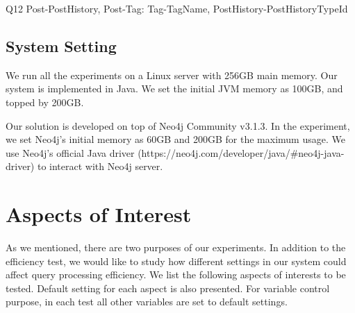 Q12 \hspace{1.3mm} Post-PostHistory, Post-Tag: Tag-TagName, PostHistory-PostHistoryTypeId





\subsection{System Setting}

We run all the experiments on a Linux server with 256GB main memory. Our system is implemented in Java. We set the initial JVM memory as 100GB, and topped by 200GB. 

Our solution is developed on top of Neo4j Community v3.1.3. In the experiment, we set Neo4j's initial memory as 60GB and 200GB for the maximum usage. We use Neo4j's official Java driver (https://neo4j.com/developer/java/#neo4j-java-driver) to interact with Neo4j server.

\section{Aspects of Interest}
\label{Aspects of Interest}

As we mentioned, there are two purposes of our experiments. In addition to the efficiency test, we would like to study how different settings in our system could affect query processing efficiency. We list the following aspects of interests to be tested. Default setting for each aspect is also presented. For variable control purpose, in each test all other variables are set to default settings.

